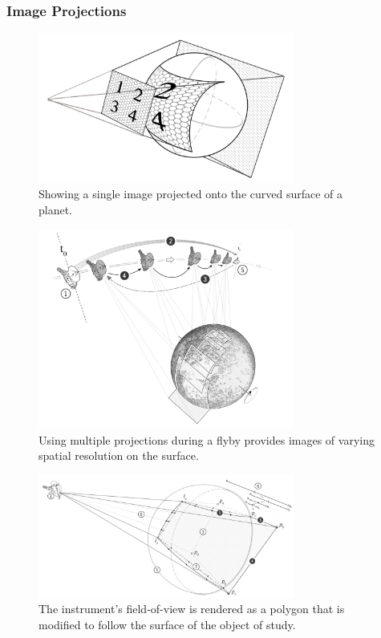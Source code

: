 \subsubsection{Image Projections} \label{contributions:astro:sc:projections}
\begin{figure}
\centering
\includegraphics[width=0.75\textwidth]{figures/contributions/sc/single_projection.png}
\caption{Showing a single image projected onto the curved surface of a planet.}
\label{contributions:astro:sc:singleprojection}
\end{figure}

\begin{figure}
\centering
\includegraphics[width=0.75\textwidth]{figures/contributions/sc/new_horizons_projection.png}
\caption{Using multiple projections during a flyby provides images of varying spatial resolution on the surface.}
\label{contributions:astro:sc:newhorizonsprojection}
\end{figure}

\begin{figure}
\centering
\includegraphics[width=0.75\textwidth]{figures/contributions/sc/intercept.png}
\caption{The instrument's field-of-view is rendered as a polygon that is modified to follow the surface of the object of study.}
\label{contributions:astro:sc:intercept}
\end{figure}


